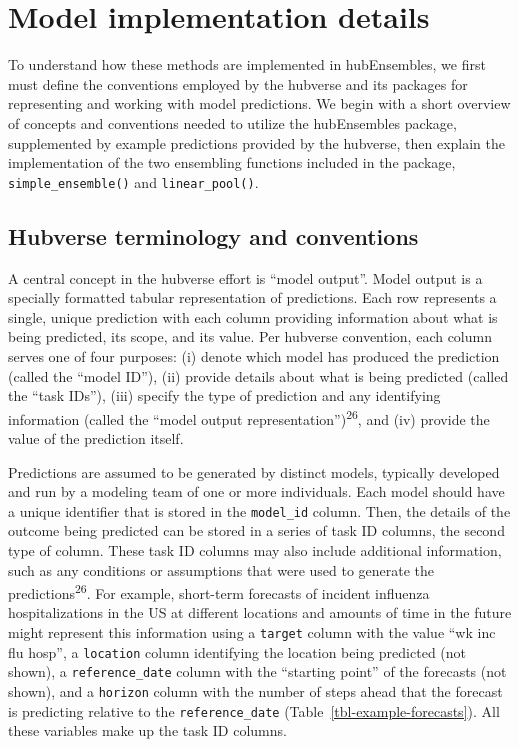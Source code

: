 \documentclass[
  letterpaper,
  DIV=11,
  numbers=noendperiod]{scrartcl}
\begin{document}
\section{Model implementation details}\label{sec-implementation}

To understand how these methods are implemented in {hubEnsembles}, we
first must define the conventions employed by the hubverse and its
packages for representing and working with model predictions. We begin
with a short overview of concepts and conventions needed to utilize the
{hubEnsembles} package, supplemented by example predictions provided by
the hubverse, then explain the implementation of the two ensembling
functions included in the package, \texttt{simple\_ensemble()} and
\texttt{linear\_pool()}.

\subsection{Hubverse terminology and
conventions}\label{hubverse-terminology-and-conventions}

A central concept in the hubverse effort is ``model output''. Model
output is a specially formatted tabular representation of predictions.
Each row represents a single, unique prediction with each column
providing information about what is being predicted, its scope, and its
value. Per hubverse convention, each column serves one of four purposes:
(i) denote which model has produced the prediction (called the ``model
ID''), (ii) provide details about what is being predicted (called the
``task IDs''), (iii) specify the type of prediction and any identifying
information (called the ``model output
representation'')\textsuperscript{26}, and (iv) provide the value of the
prediction itself.

Predictions are assumed to be generated by distinct models, typically
developed and run by a modeling team of one or more individuals. Each
model should have a unique identifier that is stored in the
\texttt{model\_id} column. Then, the details of the outcome being
predicted can be stored in a series of task ID columns, the second type
of column. These task ID columns may also include additional
information, such as any conditions or assumptions that were used to
generate the predictions\textsuperscript{26}. For example, short-term
forecasts of incident influenza hospitalizations in the US at different
locations and amounts of time in the future might represent this
information using a \texttt{target} column with the value ``wk inc flu
hosp'', a \texttt{location} column identifying the location being
predicted (not shown), a \texttt{reference\_date} column with the
``starting point'' of the forecasts (not shown), and a \texttt{horizon}
column with the number of steps ahead that the forecast is predicting
relative to the \texttt{reference\_date}
(Table~\ref{tbl-example-forecasts}). All these variables make up the
task ID columns.
\end{document}
